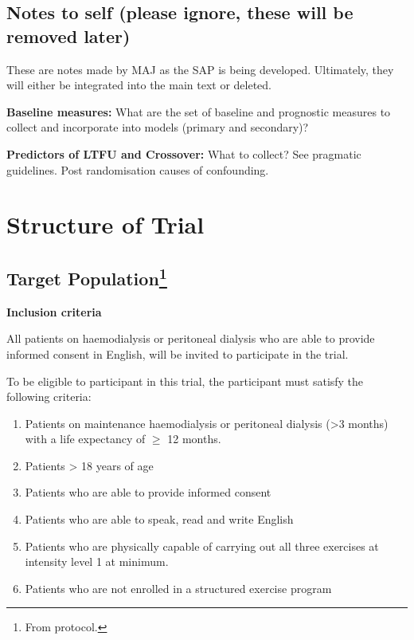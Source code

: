 \documentclass[
]{article}
\providecommand{\tightlist}{%
  \setlength{\itemsep}{0pt}\setlength{\parskip}{0pt}}
\begin{document}
\clearpage

\hypertarget{to-be-discussed}{%
\subsection{Notes to self (please ignore, these will be removed later)}\label{to-be-discussed}}

These are notes made by MAJ as the SAP is being developed.
Ultimately, they will either be integrated into the main text or deleted.

\textbf{Baseline measures:} What are the set of baseline and prognostic measures to collect and incorporate into models (primary and secondary)?

\textbf{Predictors of LTFU and Crossover:} What to collect?
See pragmatic guidelines.
Post randomisation causes of confounding.


\clearpage

\hypertarget{structure-of-trial}{%
\section{Structure of Trial}\label{structure-of-trial}}

\hypertarget{target-population}{%
\subsection[Target Population]{\texorpdfstring{Target Population\footnote{From protocol.}}{Target Population}}\label{target-population}}

\textbf{Inclusion criteria}

All patients on haemodialysis or peritoneal dialysis who are able to provide informed consent in English, will be invited to participate in the trial.

To be eligible to participant in this trial, the participant must satisfy the following criteria:

\begin{enumerate}
\def\labelenumi{\arabic{enumi}.}
\tightlist
\item Patients on maintenance haemodialysis or peritoneal dialysis (>3 months) with a life expectancy of $\ge$ 12 months.
\item Patients > 18 years of age
\item Patients who are able to provide informed consent
\item Patients who are able to speak, read and write English
\item Patients who are physically capable of carrying out all three exercises at intensity level 1 at minimum.
\item Patients who are not enrolled in a structured exercise program
\end{enumerate}
\end{document}

